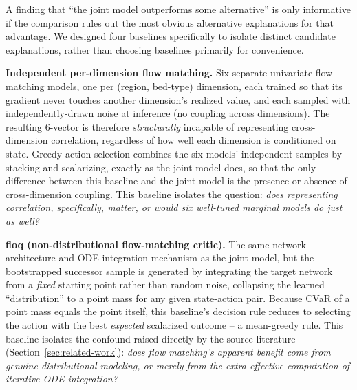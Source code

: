 \documentclass[11pt]{article}
\begin{document}
A finding that ``the joint model outperforms some alternative'' is only informative if the comparison rules out the most obvious alternative explanations for that advantage. We designed four baselines specifically to isolate distinct candidate explanations, rather than choosing baselines primarily for convenience.

\textbf{Independent per-dimension flow matching.} Six separate univariate flow-matching models, one per (region, bed-type) dimension, each trained so that its gradient never touches another dimension's realized value, and each sampled with independently-drawn noise at inference (no coupling across dimensions). The resulting $6$-vector is therefore \emph{structurally} incapable of representing cross-dimension correlation, regardless of how well each dimension is conditioned on state. Greedy action selection combines the six models' independent samples by stacking and scalarizing, exactly as the joint model does, so that the only difference between this baseline and the joint model is the presence or absence of cross-dimension coupling. This baseline isolates the question: \emph{does representing correlation, specifically, matter, or would six well-tuned marginal models do just as well?}

\textbf{floq (non-distributional flow-matching critic).} The same network architecture and ODE integration mechanism as the joint model, but the bootstrapped successor sample is generated by integrating the target network from a \emph{fixed} starting point rather than random noise, collapsing the learned ``distribution'' to a point mass for any given state-action pair. Because CVaR of a point mass equals the point itself, this baseline's decision rule reduces to selecting the action with the best \emph{expected} scalarized outcome -- a mean-greedy rule. This baseline isolates the confound raised directly by the source literature (Section~\ref{sec:related-work}): \emph{does flow matching's apparent benefit come from genuine distributional modeling, or merely from the extra effective computation of iterative ODE integration?}
\end{document}
